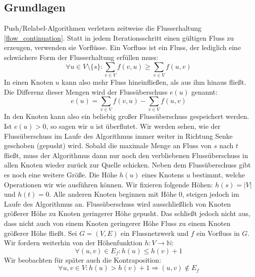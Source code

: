 \documentclass[12pt,a4paper,titlepage,onecolumn,ngerman,bibliography=totocnumbered]{scrartcl}
\theoremstyle{definition}
\theoremstyle{remark}
\newcommand{\pr}{Push/Relabel}
\begin{document}
\subsection{Grundlagen}
\pr -Algorithmen verletzen zeitweise die Flusserhaltung \eqref{flow_continuation}.
Statt in jedem Iterationsschritt einen gültigen Fluss zu erzeugen, verwenden sie Vorflüsse.
Ein Vorfluss ist ein Fluss, der lediglich eine schwächere Form der Flusserhaltung erfüllen muss:
\begin{equation}\label{eq:preflow}
	\forall u\in V\setminus\{s\}:\sum_{v\in V}f(v,u)\geq\sum_{v\in V}f(u,v)
\end{equation}
In einen Knoten $u$ kann also mehr Fluss hineinfließen, als aus ihm hinaus fließt.
Die Differenz dieser Mengen wird der Flussüberschuss $e(u)$ genannt:
\begin{equation}\label{eq:flow_excess}
	e(u) = \sum_{v\in V}f(v,u) -\sum_{v\in V}f(u,v)
\end{equation}
In den Knoten kann also ein beliebig großer Flussüberschuss gespeichert werden.
Ist $e(u)>0$, so sagen wir $u$ ist überflutet.
Wir werden sehen, wie der Flussüberschuss im Laufe des Algorithmus immer weiter in Richtung Senke geschoben (gepusht) wird.
Sobald die maximale Menge an Fluss von $s$ nach $t$ fließt, muss der Algorithmus dann nur noch den verbliebenen Flussüberschuss in allen Knoten wieder zurück zur Quelle schicken.
\medbreak
Neben dem Flussüberschuss gibt es noch eine weitere Größe.
Die Höhe $h(u)$ eines Knotens $u$ bestimmt, welche Operationen wir wie ausführen können.
Wir fixieren folgende Höhen: $h(s) = \lvert V\rvert$ und $h(t) = 0$.
Alle anderen Knoten beginnen mit Höhe $0$, steigen jedoch im Laufe des Algorithmus an.
Flussüberschuss wird ausschließlich von Knoten größerer Höhe zu Knoten geringerer Höhe gepusht.
Das schließt jedoch nicht aus, dass nicht auch von einem Knoten geringerer Höhe Fluss zu einem Knoten größerer Höhe fließt.
Sei $G=(V,E)$ ein Flussnetzwerk und $f$ ein Vorfluss in $G$.
Wir fordern weiterhin von der Höhenfunktion $h:V\to\mathbb{N}$:
\begin{equation}\label{eq:height_function}
	\forall (u,v)\in E_f: h(u)\leq h(v) + 1
\end{equation}
Wir beobachten für später auch die Kontraposition:
\begin{equation}\label{eq:contraposition_height}
	\forall u,v\in V: h(u) > h(v) + 1\Rightarrow (u,v) \not\in E_f
\end{equation}
\end{document}
